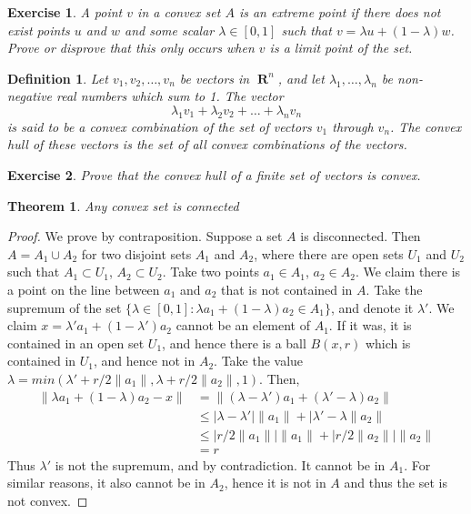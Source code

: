 \documentclass{report}
\newtheorem{theorem}{Theorem}[chapter]
\newtheorem{definition}{Definition}
\newtheorem{exercise}{Exercise}
\DeclareMathOperator{\real}{\mathbf{R}}
\begin{document}
\begin{exercise}
  A point $v$ in a convex set $A$ is an extreme point if there does not exist points $u$ and $w$ and some scalar $\lambda \in [0,1]$ such that $v = \lambda u + (1 - \lambda) w$. Prove or disprove that this only occurs when $v$ is a limit point of the set.
\end{exercise}

\begin{definition}
        Let $v_1, v_2, \dots, v_n$ be vectors in $\real^n$, and let $\lambda_1, \dots, \lambda_n$ be non-negative real numbers which sum to 1. The vector
        \[ \lambda_1 v_1 + \lambda_2 v_2 + \dots + \lambda_n v_n \]
        is said to be a convex combination of the set of vectors $v_1$ through $v_n$. The convex hull of these vectors is the set of all convex combinations of the vectors.
\end{definition}

\begin{exercise}
  Prove that the convex hull of a finite set of vectors is convex.
\end{exercise}

\begin{theorem}
  Any convex set is connected
\end{theorem}
\begin{proof}
  We prove by contraposition. Suppose a set $A$ is disconnected. Then $A = A_1 \cup A_2$ for two disjoint sets $A_1$ and $A_2$, where there are open sets $U_1$ and $U_2$ such that $A_1 \subset U_1$, $A_2 \subset U_2$. Take two points $a_1 \in A_1$, $a_2 \in A_2$. We claim there is a point on the line between $a_1$ and $a_2$ that is not contained in $A$. Take the supremum of the set $\{ \lambda \in [0,1] : \lambda a_1 + (1 - \lambda) a_2 \in A_1 \}$, and denote it $\lambda'$. We claim $x = \lambda' a_1 + (1 - \lambda') a_2$ cannot be an element of $A_1$. If it was, it is contained in an open set $U_1$, and hence there is a ball $B(x,r)$ which is contained in $U_1$, and hence not in $A_2$. Take the value $\lambda = min(\lambda' + r/2\|a_1\|, \lambda + r/2\|a_2\|, 1)$. Then,
  \begin{align*}
  \| \lambda a_1 + (1 - \lambda) a_2 - x \| &= \| (\lambda - \lambda') a_1 + (\lambda' - \lambda) a_2 \|\\
      &\leq |\lambda - \lambda'| \| a_1 \| + |\lambda' - \lambda \|a_2\|\\
      &\leq |r/2\|a_1\|| \|a_1\| + |r/2\|a_2\|| \|a_2\|\\
      &= r
  \end{align*}
  Thus $\lambda'$ is not the supremum, and by contradiction. It cannot be in $A_1$. For similar reasons, it also cannot be in $A_2$, hence it is not in $A$ and thus the set is not convex.
\end{proof}
\end{document}
